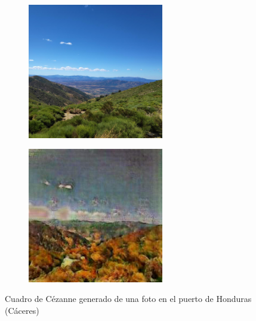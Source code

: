 \documentclass[[../main.tex]{subfiles}
\begin{document}
        \begin{figure}[!htb]
            \begin{subfigure}[b]{0.49\textwidth}
            \includegraphics[width=0.65\textwidth]{imagenes/imagen2cuadro/propias/cezanne/IMG_20200830_161526_1.jpg}
            \end{subfigure}
        \hfill
            \begin{subfigure}[b]{0.49\textwidth}
            \includegraphics[width=0.65\textwidth]{imagenes/imagen2cuadro/propias/cezanne/IMG_20200830_161526_1_2.jpg}
            \end{subfigure}
        \caption{Cuadro de Cézanne generado de una foto en el puerto de Honduras (Cáceres)}
        \label{fig:cezanne_cuadro_puerto_honduras}
        \end{figure}
        
\end{document}
